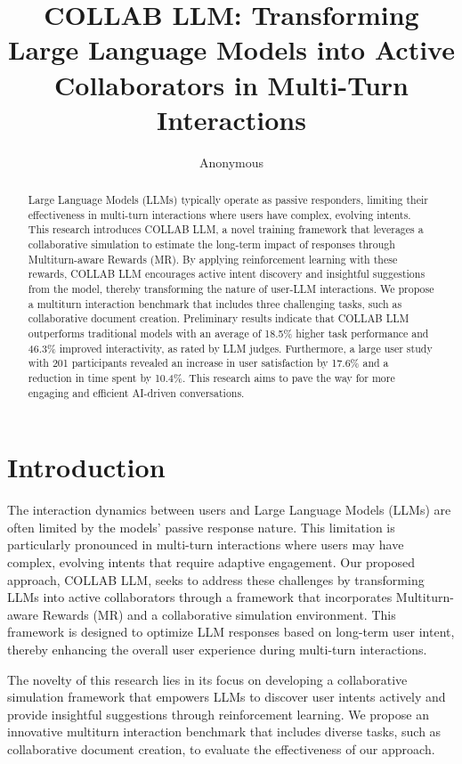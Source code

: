 \documentclass{article} %
\title{
COLLAB LLM: Transforming Large Language Models into Active Collaborators in Multi-Turn Interactions
}
\author{Anonymous}
\begin{document}
\maketitle

\begin{abstract}
Large Language Models (LLMs) typically operate as passive responders, limiting their effectiveness in multi-turn interactions where users have complex, evolving intents. This research introduces COLLAB LLM, a novel training framework that leverages a collaborative simulation to estimate the long-term impact of responses through Multiturn-aware Rewards (MR). By applying reinforcement learning with these rewards, COLLAB LLM encourages active intent discovery and insightful suggestions from the model, thereby transforming the nature of user-LLM interactions. We propose a multiturn interaction benchmark that includes three challenging tasks, such as collaborative document creation. Preliminary results indicate that COLLAB LLM outperforms traditional models with an average of 18.5\% higher task performance and 46.3\% improved interactivity, as rated by LLM judges. Furthermore, a large user study with 201 participants revealed an increase in user satisfaction by 17.6\% and a reduction in time spent by 10.4\%. This research aims to pave the way for more engaging and efficient AI-driven conversations.
\end{abstract}

\section{Introduction}
\label{sec:intro}
The interaction dynamics between users and Large Language Models (LLMs) are often limited by the models' passive response nature. This limitation is particularly pronounced in multi-turn interactions where users may have complex, evolving intents that require adaptive engagement. Our proposed approach, COLLAB LLM, seeks to address these challenges by transforming LLMs into active collaborators through a framework that incorporates Multiturn-aware Rewards (MR) and a collaborative simulation environment. This framework is designed to optimize LLM responses based on long-term user intent, thereby enhancing the overall user experience during multi-turn interactions.

The novelty of this research lies in its focus on developing a collaborative simulation framework that empowers LLMs to discover user intents actively and provide insightful suggestions through reinforcement learning. We propose an innovative multiturn interaction benchmark that includes diverse tasks, such as collaborative document creation, to evaluate the effectiveness of our approach.
\end{document}
